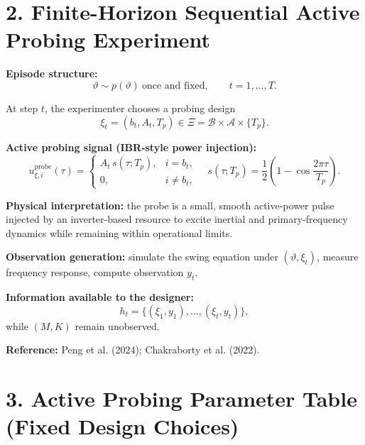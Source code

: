 \documentclass[12pt]{article}
\begin{document}
\newpage
\section*{2. Finite-Horizon Sequential Active Probing Experiment}

\textbf{Episode structure:}
\[
\vartheta\sim p(\vartheta)\ \text{once and fixed},\qquad t=1,\dots,T.
\]

At step $t$, the experimenter chooses a probing design
\[
\xi_t=(b_t,A_t,T_p)\in\Xi=\mathcal{B}\times\mathcal{A}\times\{T_p\}.
\]

\textbf{Active probing signal (IBR-style power injection):}
\[
u^{\text{probe}}_{\xi,i}(\tau)=
\begin{cases}
A_t\,s(\tau;T_p), & i=b_t,\\
0, & i\neq b_t,
\end{cases}
\quad
s(\tau;T_p)=\frac12\!\left(1-\cos\frac{2\pi\tau}{T_p}\right).
\]

\textbf{Physical interpretation:}
the probe is a small, smooth active-power pulse injected by an inverter-based
resource to excite inertial and primary-frequency dynamics while remaining
within operational limits.

\textbf{Observation generation:}
simulate the swing equation under $(\vartheta,\xi_t)$, measure frequency
response, compute observation $y_t$.

\textbf{Information available to the designer:}
\[
h_t=\{(\xi_1,y_1),\dots,(\xi_t,y_t)\},
\]
while $(M,K)$ remain unobserved.

\textbf{Reference:}
Peng et al. (2024); Chakraborty et al. (2022).

\section*{3. Active Probing Parameter Table (Fixed Design Choices)}
\end{document}

